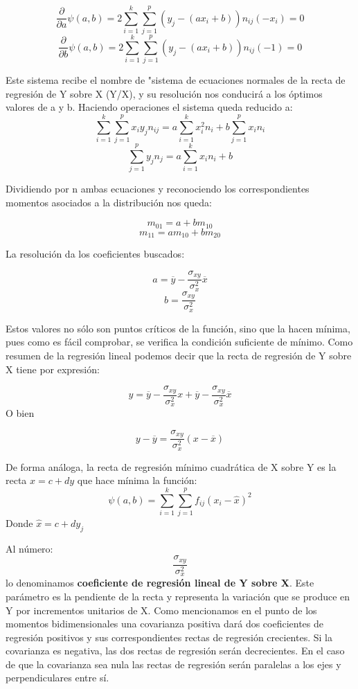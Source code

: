 \documentclass{article}
\begin{document}
	$$ \frac{\partial}{\partial a} \psi(a,b) = 2 \sum_{i=1}^k \sum_{j=1}^p ( y_j - (ax_i +b )) n_{ij} (-x_i) = 0 $$
	$$ \frac{\partial}{\partial b} \psi(a,b) = 2 \sum_{i=1}^k \sum_{j=1}^p ( y_j - (ax_i +b )) n_{ij} (-1) = 0 $$
	
	Este sistema recibe el nombre de "sistema de ecuaciones normales de la recta de regresión de Y sobre X (Y/X), y su resolución nos conducirá a los óptimos valores de a y b. Haciendo operaciones el sistema queda reducido a:
	$$  \sum_{i=1}^k \sum_{j=1}^p x_i y_j n_{ij}  = a \sum_{i=1}^k x_i^2 n_i + b\sum_{j= 1}^p x_i n_i $$
	$$ \sum_{j=1}^p y_j n_j = a \sum_{i=1}^k x_i n_i + b $$
	
	Dividiendo por n ambas ecuaciones y reconociendo los correspondientes momentos asociados a la distribución nos queda:
	
	$$
	m_{01} = a + bm_{10}$$
	$$
	m_{11} = am_{10} + bm_{20}
	$$	
	
	La resolución da los coeficientes buscados:
	
	$$
	a = \overline{y} - \frac{\sigma_{xy}}{\sigma_x^2} \overline{x}
$$	 
$$  b = \frac{\sigma_{xy}}{\sigma_x^2} $$
	 
	 Estos valores no sólo son puntos críticos de la función, sino que la hacen mínima, pues como es fácil comprobar, se verifica la condición suficiente de mínimo. Como resumen de la regresión lineal podemos decir que la recta de regresión de Y sobre X tiene por expresión:
	 
	$$ y = \overline{y} - \frac{\sigma_{xy}}{\sigma_x^2} x + \overline{y} - \frac{\sigma_{xy}}{\sigma_x^2} \overline{x}$$
	O bien
	
	$$ y - \overline{y} = \frac{\sigma_{xy}}{\sigma_x^2} (x - \overline{x}) $$
	
	De forma análoga, la recta de regresión mínimo cuadrática de X sobre Y es la recta $x = c +dy$ que hace mínima la función:
		$$\psi (a,b) = \sum_{i=1}^k \sum_{j=1}^p f_{ij} (x_i - \hat{x})^2 $$
	Donde $\hat{x} = c +dy_j $
	
	\vspace{2mm}
	
	Al número: $$\frac{\sigma_{xy}}{\sigma_x^2}$$ lo denominamos \textbf{coeficiente de regresión lineal de Y sobre X}. Este parámetro es la pendiente de la recta y representa la variación que se produce en Y por incrementos unitarios de X. Como mencionamos en el punto de los momentos bidimensionales una covarianza positiva dará dos coeficientes de regresión positivos y sus correspondientes rectas de regresión crecientes. Si la covarianza es negativa, las dos rectas de regresión serán decrecientes. En el caso de que la covarianza sea nula las rectas de regresión serán paralelas a los ejes y perpendiculares entre sí.
	
\end{document}
